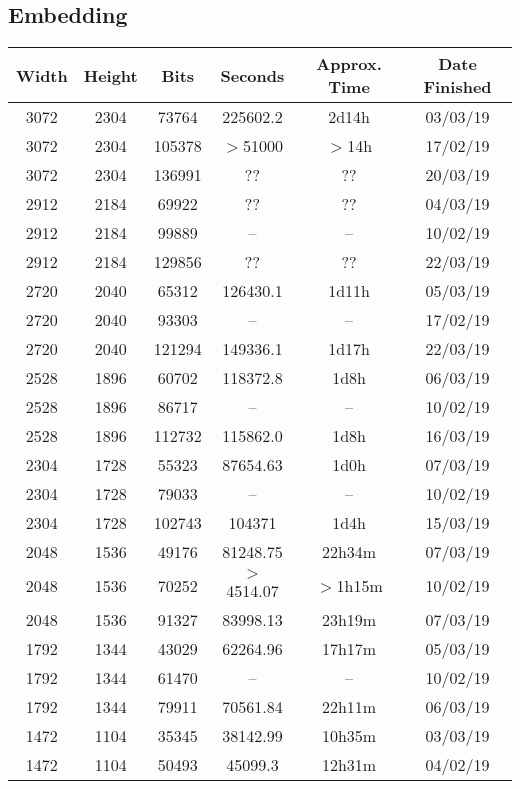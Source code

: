 \subsection{Embedding}
  \begin{center}
  \begin{tabular}{ c c c | c c c }
  Width & Height & Bits & Seconds & Approx. Time & Date Finished \\ \hline
  3072 & 2304 & 73764 & 225602.2 & 2d14h & 03/03/19 \\
  3072 & 2304 & 105378 & $>$51000 & $>$14h & 17/02/19 \\
  3072 & 2304 & 136991 & ?? & ?? & 20/03/19 \\ %
  2912 & 2184 & 69922 & ?? & ?? & 04/03/19 \\ %
  2912 & 2184 & 99889 & -- & -- & 10/02/19 \\ %
  2912 & 2184 & 129856 & ?? & ?? & 22/03/19 \\ %
  2720 & 2040 & 65312 & 126430.1 & 1d11h & 05/03/19 \\
  2720 & 2040 & 93303 & -- & -- & 17/02/19 \\ %
  2720 & 2040 & 121294 & 149336.1 & 1d17h & 22/03/19 \\
  2528 & 1896 & 60702 & 118372.8 & 1d8h & 06/03/19 \\
  2528 & 1896 & 86717 & -- & -- & 10/02/19 \\ %
  2528 & 1896 & 112732 & 115862.0 & 1d8h & 16/03/19 \\
  2304 & 1728 & 55323 & 87654.63 & 1d0h & 07/03/19 \\
  2304 & 1728 & 79033 & -- & -- & 10/02/19 \\ %
  2304 & 1728 & 102743 & 104371 & 1d4h & 15/03/19 \\
  2048 & 1536 & 49176 & 81248.75 & 22h34m & 07/03/19 \\
  2048 & 1536 & 70252 & $>$4514.07 & $>$1h15m & 10/02/19 \\
  2048 & 1536 & 91327 & 83998.13 & 23h19m & 07/03/19 \\
  1792 & 1344 & 43029 & 62264.96 & 17h17m & 05/03/19 \\
  1792 & 1344 & 61470 & -- & -- & 10/02/19 \\ %
  1792 & 1344 & 79911 & 70561.84 & 22h11m & 06/03/19 \\
  1472 & 1104 & 35345 & 38142.99 & 10h35m & 03/03/19 \\
  1472 & 1104 & 50493 & 45099.3 & 12h31m & 04/02/19 \\

\end{tabular}
\end{center}
